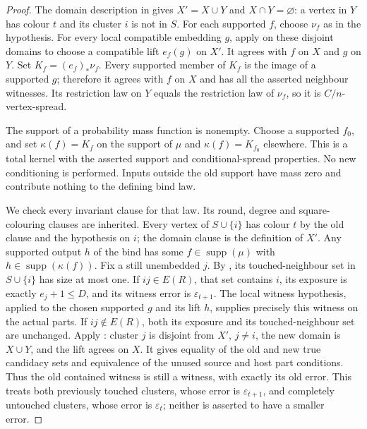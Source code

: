 \begin{proof}
The domain description in  gives
$X'=X\cup Y$ and $X\cap Y=\varnothing$: a vertex in $Y$ has colour
$t$ and its cluster $i$ is not in $S$. For each supported $f$, choose
$\nu_f$ as in the hypothesis. For every local compatible embedding
$g$, apply  on these disjoint
domains to choose a compatible lift $e_f(g)$ on $X'$. It agrees with
$f$ on $X$ and $g$ on $Y$. Set $K_f=(e_f)_*\nu_f$.
Every supported member of $K_f$ is the image of a supported $g$;
therefore it agrees with $f$ on $X$ and has all the asserted neighbour
witnesses. Its restriction law on $Y$ equals the restriction law of
$\nu_f$, so it is $C/n$-vertex-spread.

The support of a probability mass function is nonempty. Choose a
supported $f_0$, and set $\kappa(f)=K_f$ on the support of $\mu$ and
$\kappa(f)=K_{f_0}$ elsewhere. This is a total kernel with the asserted
support and conditional-spread properties. No new conditioning is
performed. Inputs outside the old support have mass zero and contribute
nothing to the defining bind law.

We check every invariant clause for that law. Its round, degree and
square-colouring clauses are inherited. Every vertex of $S\cup\{i\}$
has colour $t$ by the old clause and the hypothesis on $i$; the domain
clause is the definition of $X'$. Any supported output $h$ of the bind
has some $f\in\operatorname{supp}(\mu)$ with
$h\in\operatorname{supp}(\kappa(f))$.
Fix a still unembedded $j$. By
, its touched-neighbour set in
$S\cup\{i\}$ has size at most one. If $ij\in E(R)$, that set contains
$i$, its exposure is exactly $e_j+1\le D$, and its witness error is
$\varepsilon_{t+1}$. The local witness hypothesis, applied to the
chosen supported $g$ and its lift $h$, supplies precisely this witness
on the actual parts. If $ij\notin E(R)$, both its exposure and its
touched-neighbour set are unchanged. Apply
: cluster $j$ is
disjoint from $X'$, $j\ne i$, the new domain is $X\cup Y$, and the
lift agrees on $X$. It gives equality of the old and new true candidacy
sets and equivalence of the unused source and host part conditions.
Thus the old contained witness is still a witness, with exactly its old
error. This treats both previously touched clusters, whose error is
$\varepsilon_{t+1}$, and completely untouched clusters, whose error
is $\varepsilon_t$; neither is asserted to have a smaller error.


\end{proof}
